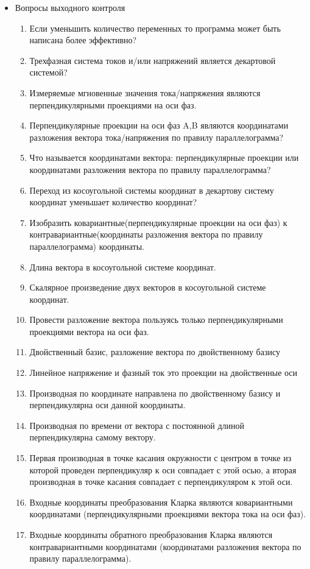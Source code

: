\begin{itemize}

\item Вопросы выходного контроля
\begin{enumerate}
\item Если уменьшить количество переменных то программа может быть написана более эффективно?
\item Трехфазная система токов и/или напряжений является декартовой системой?
\item Измеряемые мгновенные значения тока/напряжения являются перпендикулярными проекциями на оси фаз.
\item Перпендикулярные проекции на оси фаз A,B являются координатами разложения вектора тока/напряжения по правилу параллелограмма?
\item Что называется координатами вектора: перпендикулярные проекции или координатами разложения вектора по правилу параллелограмма?
\item Переход из косоугольной системы координат в декартову систему координат уменьшает количество координат?
\item Изобразить ковариантные(перпендикулярные проекции на оси фаз) к контравариантные(координаты разложения вектора по правилу параллелограмма) координаты.
\item Длина вектора в косоугольной системе координат.
\item Скалярное произведение двух векторов в косоугольной системе координат.
\item Провести разложение вектора пользуясь только перпендикулярными проекциями вектора на оси фаз.
\item Двойственный базис, разложение вектора по двойственному базису
\item Линейное напряжение и фазный ток это проекции на двойственные оси
\item Производная по координате направлена по двойственному базису и перпендикулярна оси данной координаты.
\item Производная по времени от вектора с постоянной длиной перпендикулярна самому вектору.
\item Первая производная в точке касания окружности с центром в точке из которой проведен перпендикуляр к оси совпадает с этой осью, а вторая производная в точке касания совпадает с перпендикуляром к этой оси.
\item Входные координаты преобразования Кларка являются ковариантными координатами (перпендикулярными проекциями вектора тока на оси фаз).
\item Входные координаты обратного преобразования Кларка являются контравариантными координатами (координатами разложения вектора по правилу параллелограмма).

\end{enumerate}
\end{itemize}
